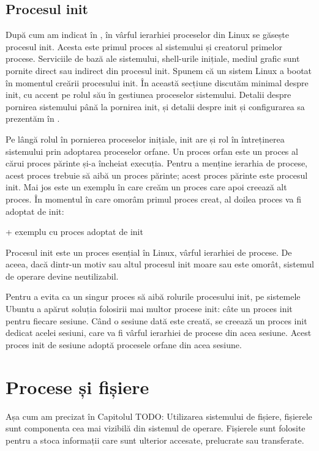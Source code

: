 \subsection{Procesul init}
\label{sec:procese-ierarhie-init}

După cum am indicat în ,
în vârful ierarhiei proceselor din Linux se găsește procesul init. Acesta este
primul proces al sistemului și creatorul primelor procese. Serviciile de bază
ale sistemului, shell-urile inițiale, mediul grafic sunt pornite direct sau
indirect din procesul init. Spunem că un sistem Linux a bootat în momentul
creării procesului init. În această secțiune discutăm minimal despre init, cu
accent pe rolul său în gestiunea proceselor sistemului. Detalii despre pornirea
sistemului până la pornirea init, și detalii despre init și configurarea sa
prezentăm în .

Pe lângă rolul în pornierea proceselor inițiale, init are și rol în întreținerea
sistemului prin adoptarea proceselor orfane. Un proces orfan este un proces al
cărui proces părinte și-a încheiat execuția. Pentru a menține ierarhia de
procese, acest proces trebuie să aibă un proces părinte; acest proces părinte
este procesul init. Mai jos este un exemplu în care creăm un proces care apoi
creează alt proces. În momentul în care omorâm primul proces creat, al doilea
proces va fi adoptat de init:

+ exemplu cu proces adoptat de init

Procesul init este un proces esențial în Linux, vârful ierarhiei de procese. De
aceea, dacă dintr-un motiv sau altul procesul init moare sau este omorât,
sistemul de operare devine neutilizabil.

Pentru a evita ca un singur proces să aibă rolurile procesului init, pe
sistemele Ubuntu a apărut soluția folosirii mai multor procese init: câte un
proces init pentru fiecare sesiune. Când o sesiune dată este creată, se creează
un proces init dedicat acelei sesiuni, care va fi vârful ierarhiei de procese
din acea sesiune. Acest proces init de sesiune adoptă procesele orfane din acea
sesiune.

\section{Procese și fișiere}
\label{sec:procese-fisiere}

Așa cum am precizat în Capitolul TODO: Utilizarea sistemului de fișiere,
fișierele sunt componenta cea mai vizibilă din sistemul de operare. Fișierele
sunt folosite pentru a stoca informații care sunt ulterior accesate, prelucrate
sau transferate.

